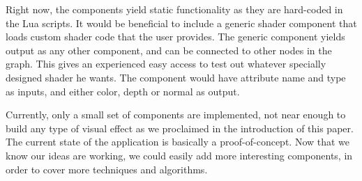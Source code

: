 
Right now, the components yield static functionality as they are hard-coded in the Lua scripts. It would be beneficial to include a generic shader component that loads custom shader code that the user provides. The generic component yields output as any other component, and can be connected to other nodes in the graph. This gives an experienced easy access to test out whatever specially designed shader he wants. The component would have attribute name and type as inputs, and either color, depth or normal as output.

Currently, only a small set of components are implemented, not near enough to build any type of visual effect as we proclaimed in the introduction of this paper. The current state of the application is basically a proof-of-concept. Now that we know our ideas are working, we could easily add more interesting components, in order to cover more techniques and algorithms.


